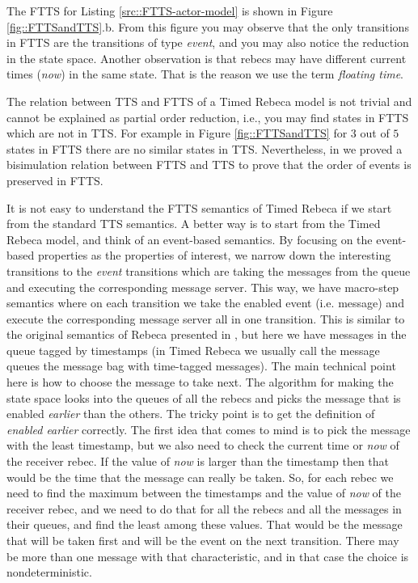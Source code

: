 The FTTS for Listing \ref{src::FTTS-actor-model} is shown in Figure \ref{fig::FTTSandTTS}.b. From this figure you may observe that the only transitions in FTTS are the transitions of type \textit{event}, and you may also notice the reduction in the state space.
%
Another observation is that
rebecs may have different current times (\textit{now}) in the same state. That is the reason we use the term \textit{floating time}.

%
The relation between TTS and FTTS of a Timed Rebeca model is not trivial and cannot be explained as partial order reduction, i.e., you may find states in FTTS which are not in TTS.
For example in Figure \ref{fig::FTTSandTTS} for $3$ out of $5$ states in FTTS there are no similar states in TTS. Nevertheless, in \cite{DBLP:conf/facs2/KhamespanahSVK15} we proved a bisimulation relation between FTTS and TTS to prove that the order of events is preserved in FTTS.

 It is not easy to understand the FTTS semantics of Timed Rebeca if we start from the standard TTS semantics. A better way is to start from the Timed Rebeca model, and think of an event-based semantics. By focusing on the event-based properties as the properties of interest, we narrow down the interesting transitions to the \textit{event} transitions which are taking the messages from the queue and executing the corresponding message server.
This way, we have macro-step semantics where on each transition we take the enabled event (i.e. message) and execute the corresponding message server all in one transition. This is similar to the original semantics of Rebeca presented in \cite{DBLP:journals/fuin/SirjaniMSB04}, but here we have messages in the queue tagged by timestamps (in Timed Rebeca we usually call the message queues the message bag with time-tagged messages). The main technical point here is how to choose the message to take next. The algorithm for making the state space looks into the queues of all the rebecs and picks the message that is enabled \textit{earlier} than the others.  The tricky point is to get the definition of \textit{enabled earlier} correctly. The first idea that comes to mind is to pick the message with the least timestamp, but we also need to check the current time or \textit{now} of the receiver rebec. If the value of \textit{now} is larger than the timestamp then that would be the time that the message can really be taken. So,  for each rebec we need to find the maximum between  the timestamps and the value of  \textit{now} of the receiver rebec, and we need to do that for all the rebecs and all the messages in their queues,  and find the least among these values. That would be the message that will be taken first and will be the event on the next transition. There may be more than one message with that characteristic, and in that case the choice is nondeterministic.


